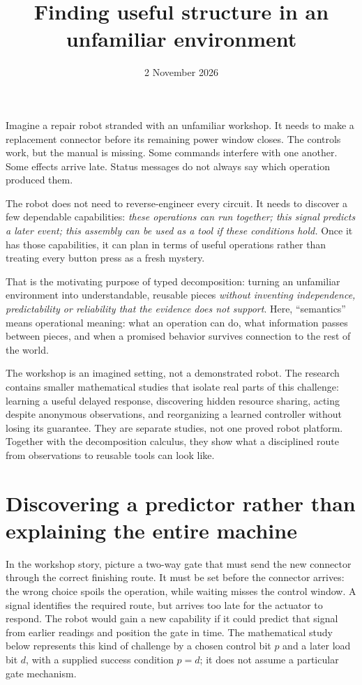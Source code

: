 \documentclass[11pt]{article}
\title{Finding useful structure in an unfamiliar environment}
\date{2 November 2026}
\begin{document}
\maketitle
\vspace{-1.5em}

Imagine a repair robot stranded with an unfamiliar workshop. It needs to make a replacement connector before its remaining power window closes. The controls work, but the manual is missing. Some commands interfere with one another. Some effects arrive late. Status messages do not always say which operation produced them.

The robot does not need to reverse-engineer every circuit. It needs to discover a few dependable capabilities: \emph{these operations can run together; this signal predicts a later event; this assembly can be used as a tool if these conditions hold.} Once it has those capabilities, it can plan in terms of useful operations rather than treating every button press as a fresh mystery.

That is the motivating purpose of typed decomposition: turning an unfamiliar environment into understandable, reusable pieces \emph{without inventing independence, predictability or reliability that the evidence does not support}. Here, ``semantics'' means operational meaning: what an operation can do, what information passes between pieces, and when a promised behavior survives connection to the rest of the world.

The workshop is an imagined setting, not a demonstrated robot. The research contains smaller mathematical studies that isolate real parts of this challenge: learning a useful delayed response, discovering hidden resource sharing, acting despite anonymous observations, and reorganizing a learned controller without losing its guarantee. They are separate studies, not one proved robot platform. Together with the decomposition calculus, they show what a disciplined route from observations to reusable tools can look like.

\section{Discovering a predictor rather than explaining the entire machine}

In the workshop story, picture a two-way gate that must send the new connector through the correct finishing route. It must be set before the connector arrives: the wrong choice spoils the operation, while waiting misses the control window. A signal identifies the required route, but arrives too late for the actuator to respond. The robot would gain a new capability if it could predict that signal from earlier readings and position the gate in time. The mathematical study below represents this kind of challenge by a chosen control bit $p$ and a later load bit $d$, with a supplied success condition $p=d$; it does not assume a particular gate mechanism.
\end{document}

